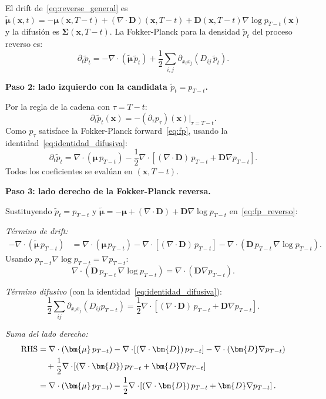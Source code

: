 El drift de~\eqref{eq:reverse_general} es
$\tilde{\bm{\mu}}(\bm{x},t) = -\bm{\mu}(\bm{x},T{-}t) + (\nabla\cdot\bm{D})(\bm{x},T{-}t)
+ \bm{D}(\bm{x},T{-}t)\nabla\log p_{T-t}(\bm{x})$
y la difusión es $\bm{\Sigma}(\bm{x},T{-}t)$. La Fokker-Planck para la densidad
$\tilde{p}_t$ del proceso reverso es:
\begin{equation}
  \partial_t\tilde{p}_t
  = -\nabla\cdot(\tilde{\bm{\mu}}\,\tilde{p}_t)
  + \frac{1}{2}\sum_{i,j}\partial_{x_ix_j}(D_{ij}\,\tilde{p}_t).
  \label{eq:fp_reverso}
\end{equation}

\medskip
\noindent\textbf{Paso 2: lado izquierdo con la candidata $\tilde{p}_t = p_{T-t}$.}

Por la regla de la cadena con $\tau = T-t$:
\[
  \partial_t\tilde{p}_t(\bm{x}) = -(\partial_\tau p_\tau)(\bm{x})\big|_{\tau=T-t}.
\]
Como $p_\tau$ satisface la Fokker-Planck forward~\eqref{eq:fp}, usando la
identidad~\eqref{eq:identidad_difusiva}:
\begin{equation}
  \partial_t\tilde{p}_t
  = \nabla\cdot(\bm{\mu}\,p_{T-t})
  - \frac{1}{2}\nabla\cdot\!\left[(\nabla\cdot\bm{D})\,p_{T-t}
    + \bm{D}\nabla p_{T-t}\right].
  \label{eq:lhs_anderson}
\end{equation}
Todos los coeficientes se evalúan en $(\bm{x},T{-}t)$.

\medskip
\noindent\textbf{Paso 3: lado derecho de la Fokker-Planck reversa.}

Sustituyendo $\tilde{p}_t = p_{T-t}$ y $\tilde{\bm{\mu}} = -\bm{\mu} +
(\nabla\cdot\bm{D}) + \bm{D}\nabla\log p_{T-t}$ en~\eqref{eq:fp_reverso}:

\textit{Término de drift:}
\begin{align*}
  -\nabla\cdot(\tilde{\bm{\mu}}\,p_{T-t})
  &= \nabla\cdot(\bm{\mu}\,p_{T-t})
    - \nabla\cdot\!\left[(\nabla\cdot\bm{D})\,p_{T-t}\right]
    - \nabla\cdot(\bm{D}\,p_{T-t}\,\nabla\log p_{T-t}).
\end{align*}
Usando $p_{T-t}\nabla\log p_{T-t} = \nabla p_{T-t}$:
\[
  \nabla\cdot(\bm{D}\,p_{T-t}\,\nabla\log p_{T-t})
  = \nabla\cdot(\bm{D}\nabla p_{T-t}).
\]

\textit{Término difusivo} (con la identidad~\eqref{eq:identidad_difusiva}):
\[
  \frac{1}{2}\sum_{ij}\partial_{x_ix_j}(D_{ij}p_{T-t})
  = \frac{1}{2}\nabla\cdot\!\left[(\nabla\cdot\bm{D})\,p_{T-t}
    + \bm{D}\nabla p_{T-t}\right].
\]

\textit{Suma del lado derecho:}
\begin{align}
  \text{RHS}
  &= \nabla\cdot(\bm{\mu}\,p_{T-t})
    - \nabla\cdot\!\left[(\nabla\cdot\bm{D})\,p_{T-t}\right]
    - \nabla\cdot(\bm{D}\nabla p_{T-t}) \notag\\
  &\quad + \frac{1}{2}\nabla\cdot\!\left[(\nabla\cdot\bm{D})\,p_{T-t}
    + \bm{D}\nabla p_{T-t}\right] \notag\\
  &= \nabla\cdot(\bm{\mu}\,p_{T-t})
    - \frac{1}{2}\nabla\cdot\!\left[(\nabla\cdot\bm{D})\,p_{T-t}
    + \bm{D}\nabla p_{T-t}\right].
  \label{eq:rhs_anderson}
\end{align}

